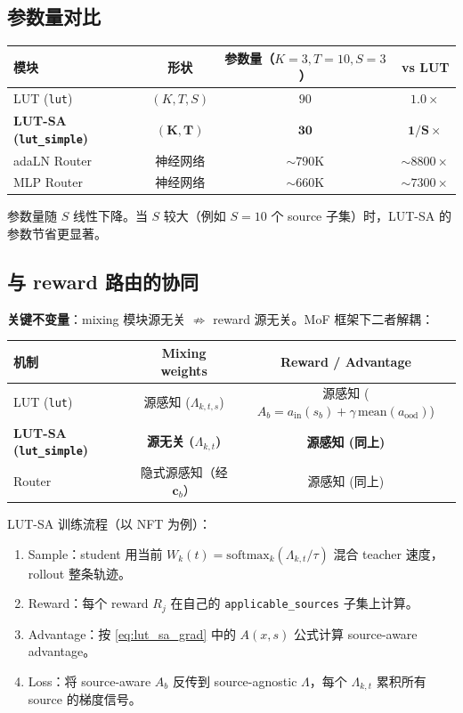 \documentclass[11pt,a4paper]{article}
\newcommand{\softmax}{\mathrm{softmax}}
\begin{document}
\subsection{参数量对比}

\begin{center}
\small
\begin{tabular}{l|cc|c}
\toprule
\textbf{模块} & \textbf{形状} & \textbf{参数量}（$K{=}3, T{=}10, S{=}3$） & \textbf{vs LUT} \\
\midrule
LUT (\texttt{lut}) & $(K, T, S)$ & $90$ & $1.0\times$ \\
\textbf{LUT-SA (\texttt{lut\_simple})} & $\mathbf{(K, T)}$ & $\mathbf{30}$ & $\mathbf{1/S \times}$ \\
adaLN Router & 神经网络 & $\sim 790$K & $\sim 8800\times$ \\
MLP Router & 神经网络 & $\sim 660$K & $\sim 7300\times$ \\
\bottomrule
\end{tabular}
\end{center}

参数量随 $S$ 线性下降。当 $S$ 较大（例如 $S = 10$ 个 source 子集）时，LUT-SA 的参数节省更显著。

\subsection{与 reward 路由的协同}

\textbf{关键不变量}：mixing 模块源无关 $\not\Rightarrow$ reward 源无关。MoF 框架下二者解耦：

\begin{center}
\begin{tabular}{l|c|c}
\toprule
\textbf{机制} & \textbf{Mixing weights} & \textbf{Reward / Advantage} \\
\midrule
LUT (\texttt{lut}) & 源感知 ($\Lambda_{k,t,s}$) & 源感知 ($A_b = a_{\text{in}}(s_b) + \gamma\,\text{mean}(a_{\text{ood}})$) \\
\textbf{LUT-SA (\texttt{lut\_simple})} & \textbf{源无关 ($\Lambda_{k,t}$)} & \textbf{源感知 (同上)} \\
Router & 隐式源感知（经 $\mathbf{c}_b$） & 源感知 (同上) \\
\bottomrule
\end{tabular}
\end{center}

LUT-SA 训练流程（以 NFT 为例）：

\begin{enumerate}
    \item Sample：student 用当前 $W_k(t) = \softmax_k(\Lambda_{k,t}/\tau)$ 混合 teacher 速度，rollout 整条轨迹。
    \item Reward：每个 reward $R_j$ 在自己的 \texttt{applicable\_sources} 子集上计算。
    \item Advantage：按 \eqref{eq:lut_sa_grad} 中的 $A(x, s)$ 公式计算 source-aware advantage。
    \item Loss：将 source-aware $A_b$ 反传到 source-agnostic $\Lambda$，每个 $\Lambda_{k,t}$ 累积所有 source 的梯度信号。
\end{enumerate}
\end{document}
